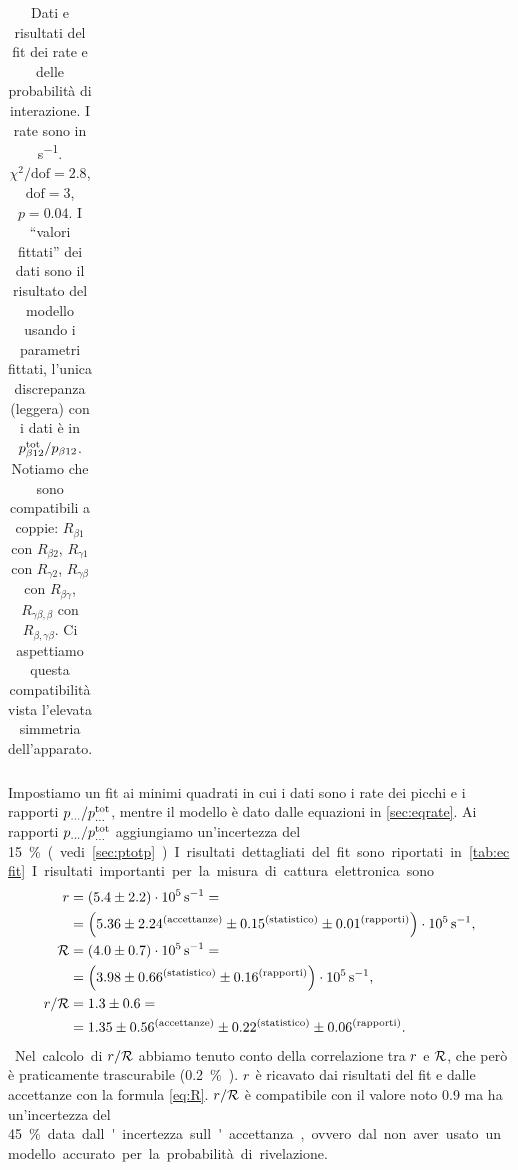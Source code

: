 \begin{table}
\begin{tabular}{ccc|cc}
	\end{tabular}
	\caption{\label{tab:ecfit}
	Dati e risultati del fit dei rate e delle probabilità di interazione.
	I rate sono in \si{s^{-1}}.
	$\chi^2/\text{dof} = 2.8$, $\text{dof}=3$, $p=0.04$.
	I ``valori fittati'' dei dati sono il risultato del modello usando i parametri fittati,
	l'unica discrepanza (leggera) con i dati è in $p_{\beta12}\tot/p_{\beta12}$.
	Notiamo che sono compatibili a coppie:
	$R_{\beta1}$ con $R_{\beta2}$,
	$R_{\gamma1}$ con $R_{\gamma2}$,
	$R_{\gamma\beta}$ con $R_{\beta\gamma}$,
	$R_{\gamma\beta,\beta}$ con $R_{\beta,\gamma\beta}$.
	Ci aspettiamo questa compatibilità vista l'elevata simmetria dell'apparato.} 
\end{table}

Impostiamo un fit ai minimi quadrati
in cui i dati sono i rate dei picchi e i rapporti $p_{\dots}/p_{\dots}\tot$,
mentre il modello è dato dalle equazioni in \autoref{sec:eqrate}.
Ai rapporti $p_{\dots}/p_{\dots}\tot$ aggiungiamo un'incertezza del \SI{15}\% (vedi \autoref{sec:ptotp}).
I risultati dettagliati del fit sono riportati in \autoref{tab:ecfit}.
I risultati importanti per la misura di cattura elettronica sono
\begin{align*}
	\R
	&= (5.4 \pm 2.2) \cdot 10^5 \,\si{s^{-1}} = \\
	&= \left(5.36
	\pm 2.24^\text{(accettanze)}
	\pm 0.15^\text{(statistico)}
	\pm 0.01^\text{(rapporti)}\right) \cdot 10^5 \,\si{s^{-1}}, \\
	\Rtot
	&= (4.0 \pm 0.7) \cdot 10^5 \,\si{s^{-1}} = \\
	&= \left(3.98
	\pm 0.66^\text{(statistico)}
	\pm 0.16^\text{(rapporti)}\right) \cdot 10^5 \,\si{s^{-1}}, \\
	\R/\Rtot
	&= 1.3 \pm 0.6 = \\
	&= 1.35 \pm 0.56^\text{(accettanze)} \pm 0.22^\text{(statistico)} \pm 0.06^\text{(rapporti)}.
\end{align*}
Nel calcolo di $\R/\Rtot$ abbiamo tenuto conto della correlazione tra $\R$ e $\Rtot$,
che però è praticamente trascurabile (\SI{0.2}\%).
$\R$ è ricavato dai risultati del fit e dalle accettanze con la formula \eqref{eq:R}.
$\R/\Rtot$ è compatibile con il valore noto 0.9
ma ha un'incertezza del \SI{45}\% data dall'incertezza sull'accettanza,
ovvero dal non aver usato un modello accurato per la probabilità di rivelazione.
